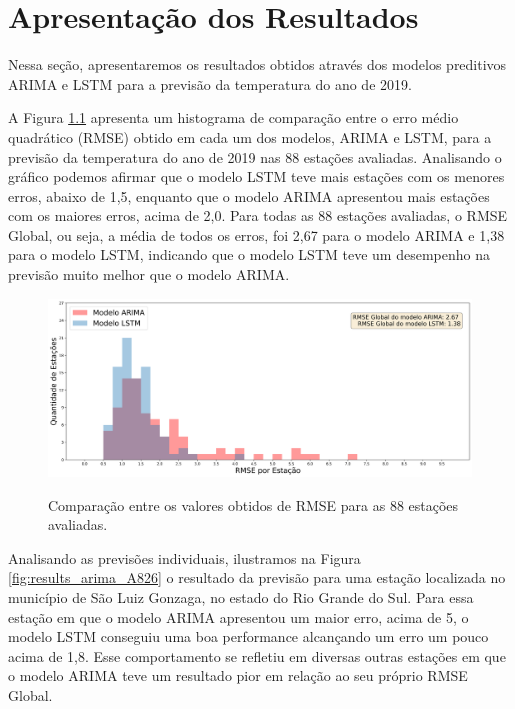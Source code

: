 \chapter{Apresentação dos Resultados}

Nessa seção, apresentaremos os resultados obtidos através dos modelos preditivos ARIMA e LSTM para a previsão da temperatura do ano de 2019. 

A Figura \ref{fig:results_histogram_arima_model_rmse} apresenta um histograma de comparação entre o erro médio quadrático (RMSE) obtido em cada um dos modelos, ARIMA e LSTM, para a previsão da temperatura do ano de 2019 nas 88 estações avaliadas. Analisando o gráfico podemos afirmar que o modelo LSTM teve mais estações com os menores erros, abaixo de 1,5, enquanto que o modelo ARIMA apresentou mais estações com os maiores erros, acima de 2,0. Para todas as 88 estações avaliadas, o RMSE  Global, ou seja, a média de todos os erros, foi 2,67 para o modelo ARIMA e 1,38 para o modelo LSTM, indicando que o modelo LSTM teve um desempenho na previsão muito melhor que o modelo ARIMA. 
 
 \begin{figure}[H]
    \centering
    \caption{Comparação entre os valores obtidos de RMSE para as 88 estações avaliadas.}
    \includegraphics[width=\textwidth]{figuras/results/comparacao_rmse_arima_lstm_histograma.png}
    \label{fig:results_histogram_arima_model_rmse}
\end{figure}

Analisando as previsões individuais, ilustramos na Figura \ref{fig:results_arima_A826} o resultado da previsão para uma estação localizada no município de São Luiz Gonzaga, no estado do Rio Grande do Sul. Para essa estação em que o modelo ARIMA apresentou um maior erro, acima de 5, o modelo LSTM conseguiu uma boa performance alcançando um erro um pouco acima de 1,8. Esse comportamento se refletiu em diversas outras estações em que o modelo ARIMA teve um resultado pior em relação ao seu próprio RMSE Global.  


